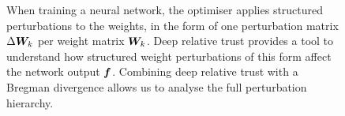 \begin{figure}
    \caption{ When training a neural network, the optimiser applies structured perturbations to the weights, in the form of one perturbation matrix $\Delta {\bm{W}}_k$ per weight matrix ${\bm{W}}_k$. Deep relative trust \citep{my-fromage} provides a tool to understand how structured weight perturbations of this form affect the network output ${\bm{f}}$. Combining deep relative trust with a Bregman divergence \citep{bregman1967relaxation} allows us to analyse the full perturbation hierarchy.}
    \label{fig:apbs}
\end{figure}